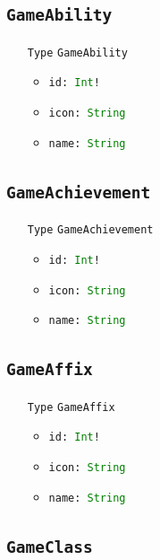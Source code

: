 \documentclass[10pt, a4paper]{memoir}
\numberwithin{equation}{section}
\theoremstyle{plain}
\theoremstyle{defp}
\theoremstyle{dotless}
\theoremstyle{definition}
\theoremstyle{dotless}
\theoremstyle{dotless}
\theoremstyle{defp}
\theoremstyle{defp}
\theoremstyle{be}          %
\theoremstyle{defp}
\newcommand\ttt[1]{\texttt{#1}}
\newcommand\type[1]{\ttt{\textcolor{green}{#1}}}
\begin{document}
\subsection{\ttt{GameAbility}}\label{sec:GameAbility}

\begin{itemize}[noitemsep,topsep=1pt]
\item[\ttt{Type}] \ttt{GameAbility}
\begin{itemize}[itemsep=1pt,topsep=1pt]
\item \ttt{id: \type{Int}!}
\item \ttt{icon: \type{String}}
\item \ttt{name: \type{String}}
\end{itemize}
\end{itemize}

\subsection{\ttt{GameAchievement}}\label{sec:GameAchievement}

\begin{itemize}[noitemsep,topsep=1pt]
\item[\ttt{Type}] \ttt{GameAchievement}
\begin{itemize}[itemsep=1pt,topsep=1pt]
\item \ttt{id: \type{Int}!}
\item \ttt{icon: \type{String}}
\item \ttt{name: \type{String}}
\end{itemize}
\end{itemize}

\subsection{\ttt{GameAffix}}\label{sec:GameAffix}

\begin{itemize}[noitemsep,topsep=1pt]
\item[\ttt{Type}] \ttt{GameAffix}
\begin{itemize}[itemsep=1pt,topsep=1pt]
\item \ttt{id: \type{Int}!}
\item \ttt{icon: \type{String}}
\item \ttt{name: \type{String}}
\end{itemize}
\end{itemize}

\subsection{\ttt{GameClass}}\label{sec:GameClass}
\end{document}
